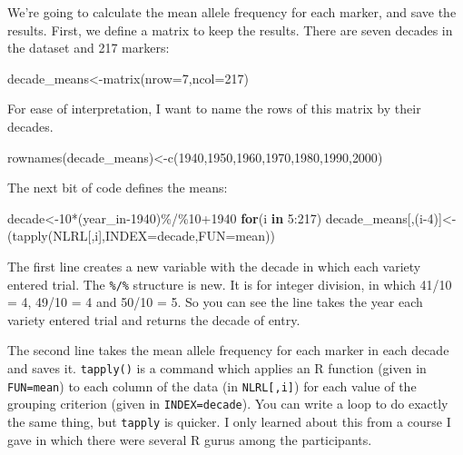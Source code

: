 \documentclass[
]{book}
\newenvironment{Shaded}{\begin{snugshade}}{\end{snugshade}}
\newcommand{\AttributeTok}[1]{\textcolor[rgb]{0.77,0.63,0.00}{#1}}
\newcommand{\ControlFlowTok}[1]{\textcolor[rgb]{0.13,0.29,0.53}{\textbf{#1}}}
\newcommand{\DecValTok}[1]{\textcolor[rgb]{0.00,0.00,0.81}{#1}}
\newcommand{\FunctionTok}[1]{\textcolor[rgb]{0.00,0.00,0.00}{#1}}
\newcommand{\NormalTok}[1]{#1}
\newcommand{\OtherTok}[1]{\textcolor[rgb]{0.56,0.35,0.01}{#1}}
\newcommand{\SpecialCharTok}[1]{\textcolor[rgb]{0.00,0.00,0.00}{#1}}
\begin{document}
We're going to calculate the mean allele frequency for each marker, and save the results.
First, we define a matrix to keep the results. There are seven decades in the dataset and 217
markers:

\begin{Shaded}
\begin{Highlighting}[]
\NormalTok{decade\_means}\OtherTok{\textless{}{-}}\FunctionTok{matrix}\NormalTok{(}\AttributeTok{nrow=}\DecValTok{7}\NormalTok{,}\AttributeTok{ncol=}\DecValTok{217}\NormalTok{)}
\end{Highlighting}
\end{Shaded}

For ease of interpretation, I want to name the rows of this matrix by their decades.

\begin{Shaded}
\begin{Highlighting}[]
\FunctionTok{rownames}\NormalTok{(decade\_means)}\OtherTok{\textless{}{-}}\FunctionTok{c}\NormalTok{(}\DecValTok{1940}\NormalTok{,}\DecValTok{1950}\NormalTok{,}\DecValTok{1960}\NormalTok{,}\DecValTok{1970}\NormalTok{,}\DecValTok{1980}\NormalTok{,}\DecValTok{1990}\NormalTok{,}\DecValTok{2000}\NormalTok{)}
\end{Highlighting}
\end{Shaded}

The next bit of code defines the means:

\begin{Shaded}
\begin{Highlighting}[]
\NormalTok{decade}\OtherTok{\textless{}{-}}\DecValTok{10}\SpecialCharTok{*}\NormalTok{(year\_in}\DecValTok{{-}1940}\NormalTok{)}\SpecialCharTok{\%/\%}\DecValTok{10}\SpecialCharTok{+}\DecValTok{1940}
\ControlFlowTok{for}\NormalTok{(i }\ControlFlowTok{in} \DecValTok{5}\SpecialCharTok{:}\DecValTok{217}\NormalTok{) decade\_means[,(i}\DecValTok{{-}4}\NormalTok{)]}\OtherTok{\textless{}{-}}\NormalTok{(}\FunctionTok{tapply}\NormalTok{(NLRL[,i],}\AttributeTok{INDEX=}\NormalTok{decade,}\AttributeTok{FUN=}\NormalTok{mean))}
\end{Highlighting}
\end{Shaded}

The first line creates a new variable with the decade in which each variety entered trial. The \texttt{\%/\%} structure is new. It is for integer division, in which 41/10 = 4, 49/10 = 4 and 50/10 = 5. So you can see the line takes the year each variety entered trial and returns the decade of entry.

The second line takes the mean allele frequency for each marker in each decade and saves
it. \texttt{tapply()} is a command which applies an R function (given in \texttt{FUN=mean}) to each column
of the data (in \texttt{NLRL{[},i{]}}) for each value of the grouping criterion (given in \texttt{INDEX=decade}). You can write a loop to do exactly the same thing, but \texttt{tapply} is quicker. I only learned about this from a course I gave in which there were several R gurus among the participants.
\end{document}
